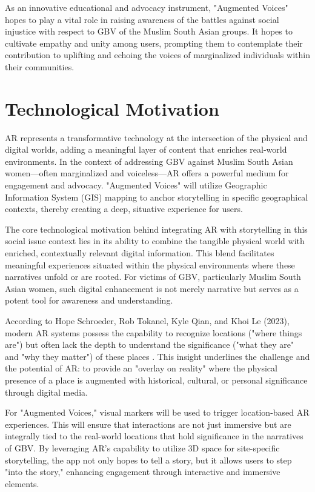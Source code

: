 \documentclass[manuscript,screen]{acmart}
\begin{document}
As an innovative educational and advocacy instrument, "Augmented Voices" hopes to play a vital role in raising awareness of the battles against social injustice with respect to GBV of the Muslim South Asian groups. It hopes to cultivate empathy and unity among users, prompting them to contemplate their contribution to uplifting and echoing the voices of marginalized individuals within their communities.

\section{Technological Motivation}
AR represents a transformative technology at the intersection of the physical and digital worlds, adding a meaningful layer of content that enriches real-world environments. In the context of addressing GBV against Muslim South Asian women—often marginalized and voiceless—AR offers a powerful medium for engagement and advocacy. "Augmented Voices" will utilize Geographic Information System (GIS) mapping to anchor storytelling in specific geographical contexts, thereby creating a deep, situative experience for users.

The core technological motivation behind integrating AR with storytelling in this social issue context lies in its ability to combine the tangible physical world with enriched, contextually relevant digital information. This blend facilitates meaningful experiences situated within the physical environments where these narratives unfold or are rooted. For victims of GBV, particularly Muslim South Asian women, such digital enhancement is not merely narrative but serves as a potent tool for awareness and understanding.

According to Hope Schroeder, Rob Tokanel, Kyle Qian, and Khoi Le (2023), modern AR systems possess the capability to recognize locations ("where things are") but often lack the depth to understand the significance ("what they are" and "why they matter") of these places \cite{48}. This insight underlines the challenge and the potential of AR: to provide an "overlay on reality" where the physical presence of a place is augmented with historical, cultural, or personal significance through digital media.

For "Augmented Voices," visual markers will be used to trigger location-based AR experiences. This will ensure that interactions are not just immersive but are integrally tied to the real-world locations that hold significance in the narratives of GBV. By leveraging AR's capability to utilize 3D space for site-specific storytelling, the app not only hopes to tell a story, but it allows users to step "into the story," enhancing engagement through interactive and immersive elements.
\end{document}
